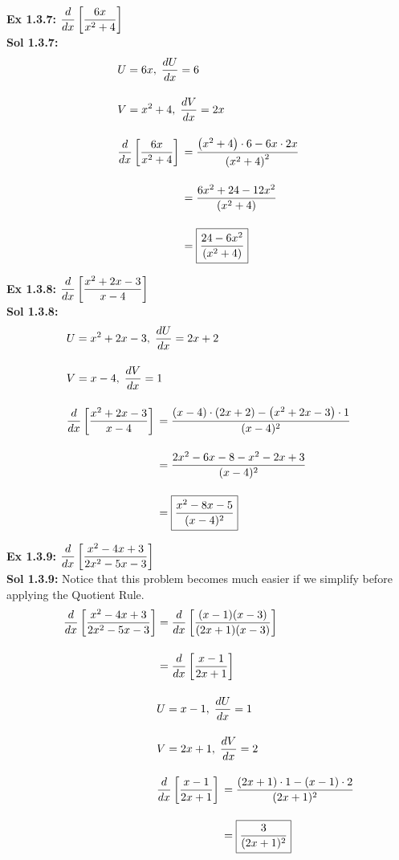 \textbf{Ex 1.3.7: } $\dfrac{d}{dx} \left[\dfrac{6x}{x^2 + 4}\right]$ \\[11pt]
\textbf{Sol 1.3.7: } \begin{align*}
    & U = 6x, \; \dfrac{dU}{dx} = 6 \\[11pt]
    & V = x^2 + 4, \; \dfrac{dV}{dx} = 2x \\[11pt]
    & \dfrac{d}{dx} \left[\dfrac{6x}{x^2 + 4}\right] \begin{aligned}[t]
        & = \dfrac{\left(x^2 + 4\right) \cdot 6 - 6x \cdot 2x}{\left(x^2 + 4\right)^2} \\[11pt]
        & = \dfrac{6x^2 + 24 - 12x^2}{\left(x^2 + 4\right)} \\[11pt]
        & = \boxed{\dfrac{24 - 6x^2}{\left(x^2 + 4\right)}}
    \end{aligned}
\end{align*}

\textbf{Ex 1.3.8: } $\dfrac{d}{dx} \left[\dfrac{x^2 + 2x - 3}{x - 4}\right]$ \\[11pt]
\textbf{Sol 1.3.8: } \begin{align*}
    & U = x^2 + 2x - 3, \; \dfrac{dU}{dx} = 2x + 2 \\[11pt]
    & V = x - 4, \; \dfrac{dV}{dx} = 1 \\[11pt]
    & \dfrac{d}{dx} \left[\dfrac{x^2 + 2x - 3}{x - 4}\right] \begin{aligned}[t]
        & = \dfrac{(x - 4) \cdot (2x + 2) - \left(x^2 + 2x - 3\right) \cdot 1}{(x - 4)^2} \\[11pt]
        & = \dfrac{2x^2 - 6x - 8 - x^2 - 2x + 3}{(x - 4)^2} \\[11pt]
        & = \boxed{\dfrac{x^2 - 8x - 5}{(x - 4)^2}}
    \end{aligned}
\end{align*} 

\textbf{Ex 1.3.9: } $\dfrac{d}{dx} \left[\dfrac{x^2 - 4x + 3}{2x^2 - 5x - 3}\right]$ \\[11pt]
\textbf{Sol 1.3.9: } Notice that this problem becomes much easier if we simplify before applying the Quotient Rule. \begin{align*}
    \dfrac{d}{dx} \left[\dfrac{x^2 - 4x + 3}{2x^2 - 5x - 3}\right] & = \dfrac{d}{dx} \left[\dfrac{(x - 1)(x - 3)}{(2x + 1)(x - 3)}\right] \\[11pt] 
    & = \dfrac{d}{dx} \left[\dfrac{x - 1}{2x + 1}\right] \\[11pt]
    & U = x - 1, \; \dfrac{dU}{dx} = 1 \\[11pt]
    & V = 2x + 1, \; \dfrac{dV}{dx} = 2 \\[11pt]
    & \dfrac{d}{dx} \left[\dfrac{x - 1}{2x + 1}\right] \begin{aligned}[t]
        & = \dfrac{(2x + 1) \cdot 1 - (x - 1) \cdot 2}{(2x + 1)^2} \\[11pt]
        & = \boxed{\dfrac{3}{(2x + 1)^2}}
    \end{aligned}
\end{align*}


